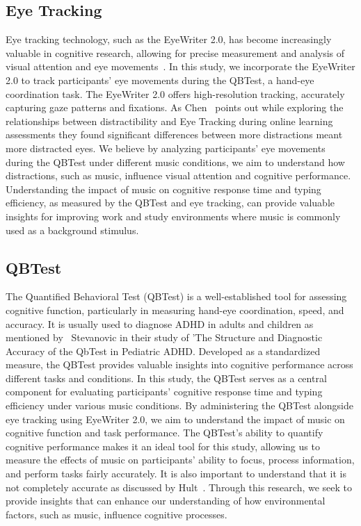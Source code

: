 \documentclass[manuscript, screen, review]{acmart} %
\begin{document}
\subsection{Eye Tracking}
Eye tracking technology, such as the EyeWriter 2.0, has become increasingly valuable in cognitive research, allowing for precise measurement and analysis of visual attention and eye movements~\cite{Rana8642988}. 
In this study, we incorporate the EyeWriter 2.0 to track participants' eye movements during the QBTest, a hand-eye coordination task.
The EyeWriter 2.0 offers high-resolution tracking, accurately capturing gaze patterns and fixations.
As Chen~\cite{Chen23876} points out while exploring the relationships between distractibility and Eye Tracking during online learning assessments they found significant differences between more distractions meant more distracted eyes. We believe by analyzing participants' eye movements during the QBTest under different music conditions, we aim to understand how distractions, such as music, influence visual attention and cognitive performance.
Understanding the impact of music on cognitive response time and typing efficiency, as measured by the QBTest and eye tracking, can provide valuable insights for improving work and study environments where music is commonly used as a background stimulus.

\subsection{QBTest}
The Quantified Behavioral Test (QBTest) is a well-established tool for assessing cognitive function, particularly in measuring hand-eye coordination, speed, and accuracy. 
It is usually used to diagnose ADHD in adults and children as mentioned by~\cite{Stevanovic} Stevanovic in their study of 'The Structure and Diagnostic Accuracy of the QbTest in Pediatric ADHD.
Developed as a standardized measure, the QBTest provides valuable insights into cognitive performance across different tasks and conditions.
In this study, the QBTest serves as a central component for evaluating participants' cognitive response time and typing efficiency under various music conditions.
By administering the QBTest alongside eye tracking using EyeWriter 2.0, we aim to understand the impact of music on cognitive function and task performance.
The QBTest's ability to quantify cognitive performance makes it an ideal tool for this study, allowing us to measure the effects of music on participants' ability to focus, process information, and perform tasks fairly accurately. 
It is also important to understand that it is not completely accurate as discussed by Hult~\cite{Hult}.
Through this research, we seek to provide insights that can enhance our understanding of how environmental factors, such as music, influence cognitive processes.
\end{document}
